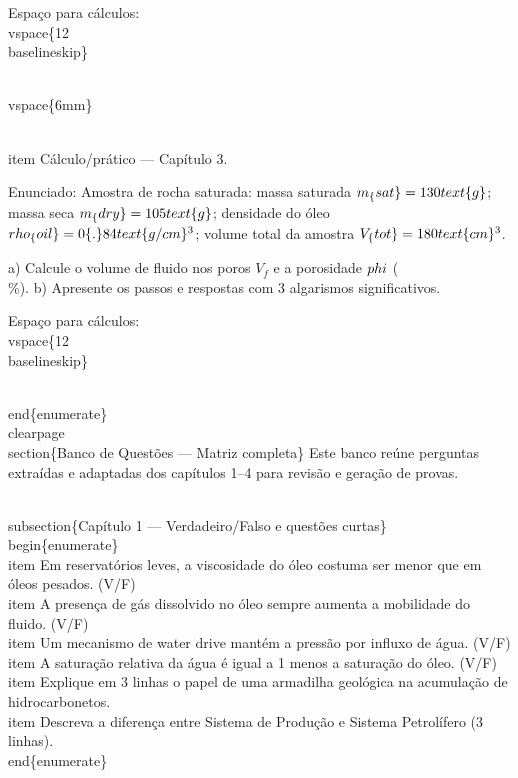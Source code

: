 \documentclass[11pt,a4paper]{article}
\begin{document}
\begin{enumerate}
{Espaço para cálculos: \\vspace\{12\\baselineskip\}

\\vspace\{6mm\}

\\item Cálculo/prático — Capítulo 3.

Enunciado: Amostra de rocha saturada: massa saturada $m_\{sat\}=130\\ \\text\{g\}$; massa seca $m_\{dry\}=105\\ \\text\{g\}$; densidade do óleo $\\rho_\{oil\}=0\{.\}84\\ \\text\{g/cm\}^3$; volume total da amostra $V_\{tot\}=180\\ \\text\{cm\}^3$.

a) Calcule o volume de fluido nos poros $V_f$ e a porosidade $\\phi$ (\\\%).  
b) Apresente os passos e respostas com 3 algarismos significativos.

Espaço para cálculos: \\vspace\{12\\baselineskip\}

\\end\{enumerate\}
\\clearpage
\\section\{Banco de Questões — Matriz completa\}
Este banco reúne perguntas extraídas e adaptadas dos capítulos 1–4 para revisão e geração de provas.

\\subsection\{Capítulo 1 — Verdadeiro/Falso e questões curtas\}
\\begin\{enumerate\}
\\item Em reservatórios leves, a viscosidade do óleo costuma ser menor que em óleos pesados. (V/F)
\\item A presença de gás dissolvido no óleo sempre aumenta a mobilidade do fluido. (V/F)
\\item Um mecanismo de water drive mantém a pressão por influxo de água. (V/F)
\\item A saturação relativa da água é igual a 1 menos a saturação do óleo. (V/F)
\\item Explique em 3 linhas o papel de uma armadilha geológica na acumulação de hidrocarbonetos.
\\item Descreva a diferença entre Sistema de Produção e Sistema Petrolífero (3 linhas).
\\end\{enumerate\}

}
\end{enumerate}
\end{document}
